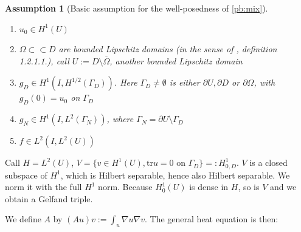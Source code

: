 \documentclass[english,a4paper,9pt,oneside]{scrbook}	%
\theoremstyle{break}
\newtheorem{ass}[equation]{Assumption}
\newtheorem{pb}[equation]{Problem}
\theoremstyle{remark}
\newcommand{\tr}{\text{tr}}
\newcommand{\cc}{\subset\subset}
\begin{document}
\begin{appendices}
\begin{ass}[Basic assumption for the well-posedness of \cref{pb:mix}]
\label{ass:basic_par_mix}
\textcolor{white}{ }
\begin{enumerate}
	\item $u_0 \in H^1(U)$
	\item $\Omega \cc D$ are bounded Lipschitz domains (in the sense of \cite{grisvard}, definition 1.2.1.1.), call $U:=D\setminus \overline{\Omega}$, another bounded Lipschitz domain
	\item $g_D \in H^1(I, H^{1/2}(\Gamma_D))$. Here $\Gamma_D\neq \emptyset$ is either $\partial U, \partial D $ or $\partial \Omega$, with $g_D(0) = u_0$ on $\Gamma_D$
	\item $g_N \in H^1(I, L^2(\Gamma_N))$, where $\Gamma_N = \partial U \setminus \Gamma_D$
	\item $f \in L^2(I, L^2(U))$
\end{enumerate}
\end{ass}



Call $H=L^2(U)$, $V=\{ v \in H^1(U), \tr u = 0 \text{ on } \Gamma_D\}=:H^1_{0,D}$. $V$ is a closed subspace of $H^1$, which is Hilbert separable, hence also Hilbert separable. We norm it with the full $H^1$ norm. Because $H^1_0(U)$ is dense in $H$, so is $V$ and we obtain a Gelfand triple. 


We define $A$ by $(Au)v:=\int_u\nabla u \nabla v$. The general heat equation is then:
%
%
%
%
%


\end{appendices}
\end{document}
